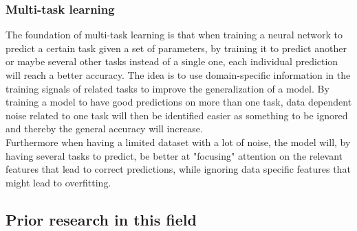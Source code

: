 \begin{multicols}{2}
\subsubsection{Multi-task learning}
The foundation of multi-task learning is that when training a neural network to predict a certain task given a set of parameters, by training it to predict another or maybe several other tasks instead of a single one, each individual prediction will reach a better accuracy. The idea is to use domain-specific information in the training signals of related tasks to improve the generalization of a model. By training a model to have good predictions on more than one task, data dependent noise related to one task will then be identified easier as something to be ignored and thereby the general accuracy will increase. \citep{ruder-2017}\\
Furthermore when having a limited dataset with a lot of noise, the model will, by having several tasks to predict, be better at "focusing" attention on the relevant features that lead to correct predictions, while ignoring data specific features that might lead to overfitting. 

\subsection{Prior research in this field}


\end{multicols}
